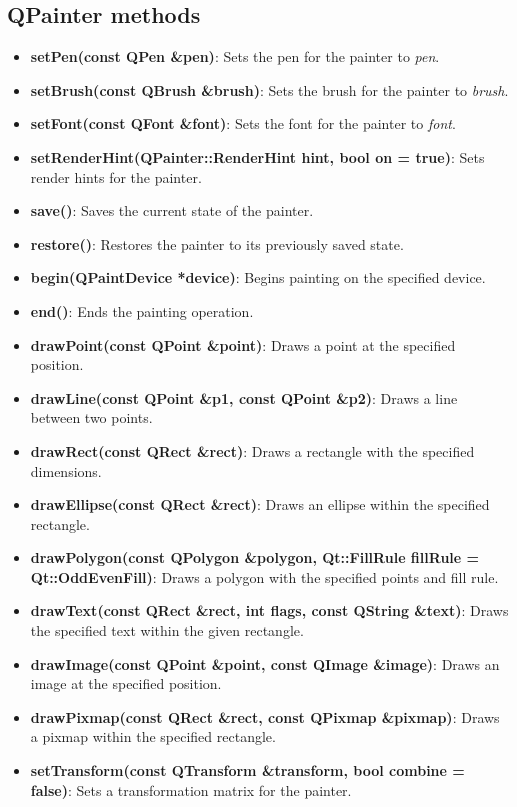 \documentclass{report}
\begin{document}
    \subsection{QPainter methods}
    \begin{itemize}
        \item \textbf{setPen(const QPen \&pen)}: Sets the pen for the painter to \textit{pen}.
        \item \textbf{setBrush(const QBrush \&brush)}: Sets the brush for the painter to \textit{brush}.
        \item \textbf{setFont(const QFont \&font)}: Sets the font for the painter to \textit{font}.
        \item \textbf{setRenderHint(QPainter::RenderHint hint, bool on = true)}: Sets render hints for the painter.
        \item \textbf{save()}: Saves the current state of the painter.
        \item \textbf{restore()}: Restores the painter to its previously saved state.
        \item \textbf{begin(QPaintDevice *device)}: Begins painting on the specified device.
        \item \textbf{end()}: Ends the painting operation.
        \item \textbf{drawPoint(const QPoint \&point)}: Draws a point at the specified position.
        \item \textbf{drawLine(const QPoint \&p1, const QPoint \&p2)}: Draws a line between two points.
        \item \textbf{drawRect(const QRect \&rect)}: Draws a rectangle with the specified dimensions.
        \item \textbf{drawEllipse(const QRect \&rect)}: Draws an ellipse within the specified rectangle.
        \item \textbf{drawPolygon(const QPolygon \&polygon, Qt::FillRule fillRule = Qt::OddEvenFill)}: Draws a polygon with the specified points and fill rule.
        \item \textbf{drawText(const QRect \&rect, int flags, const QString \&text)}: Draws the specified text within the given rectangle.
        \item \textbf{drawImage(const QPoint \&point, const QImage \&image)}: Draws an image at the specified position.
        \item \textbf{drawPixmap(const QRect \&rect, const QPixmap \&pixmap)}: Draws a pixmap within the specified rectangle.
        \item \textbf{setTransform(const QTransform \&transform, bool combine = false)}: Sets a transformation matrix for the painter.

\end{itemize}
\end{document}
